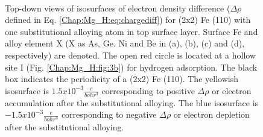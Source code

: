 \begingroup
\begin{figure}[!ht]
  \centering
  \label{Chap:Mg_H:fig:9a}
  \label{Chap:Mg_H:fig:9b}
  \\
  \label{Chap:Mg_H:fig:9c}
  \label{Chap:Mg_H:fig:9d}  
\caption[Top-down views of isosurfaces of electron density difference for (2x2) Fe (110) with one substitutional alloying atom in top surface layer]{Top-down views of isosurfaces of electron density difference ($\Delta \rho$ defined in Eq. \ref{Chap:Mg_H:eq:chargediff}) for (2x2) Fe (110) with one substitutional alloying atom in top surface layer. Surface Fe and alloy element X (X as As, Ge. Ni and Be in (a), (b), (c) and (d), respectively) are denoted. The open red circle is located at a hollow site I (Fig. \ref{Chap:Mg_H:fig:3b}) for hydrogen adsorption. The black box indicates the periodicity of a (2x2) Fe (110). The yellowish isosurface is $1.5x10^{-3}\frac{e}{bohr^3}$ corresponding to positive $\Delta \rho$ or electron accumulation after the substitutional alloying. The blue isosurface is $-1.5x10^{-3}\frac{e}{bohr^3}$ corresponding to negative $\Delta \rho$ or electron depletion after the substitutional alloying.}
  \label{Chap:Mg_H:fig9}
\end{figure}
\endgroup





